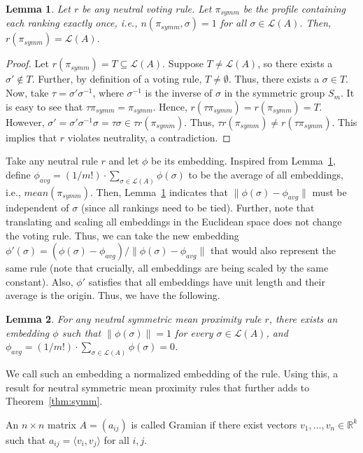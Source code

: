 \documentclass[10pt,letterpaper]{article}
\newcommand{\calL}{{\mathcal{L}}}
\newcommand{\rank}{{\calL(A)}}
\newtheorem{lemma}{Lemma}
\newenvironment{definition}[1][Definition]{\begin{trivlist}
\item[\hskip \labelsep {\bfseries #1}]}{\end{trivlist}}
\begin{document}
\begin{lemma}
Let $r$ be any neutral voting rule. Let $\pi_{symm}$ be the profile containing each ranking exactly once, i.e., $n(\pi_{symm},\sigma) = 1$ for all $\sigma \in \rank$. Then, $r(\pi_{symm}) = \rank$. 
\label{lem:average-profile}
\end{lemma}
\begin{proof}
Let $r(\pi_{symm}) = T \subseteq \rank$. Suppose $T \neq \rank$, so there exists a $\sigma' \notin T$. Further, by definition of a voting rule, $T \neq \emptyset$. Thus, there exists a $\sigma \in T$. Now, take $\tau = \sigma' \sigma^{-1}$, where $\sigma^{-1}$ is the inverse of $\sigma$ in the symmetric group $S_m$. It is easy to see that $\tau \pi_{symm} = \pi_{symm}$. Hence, $r(\tau \pi_{symm}) = r(\pi_{symm}) = T$. However, $\sigma' = \sigma' \sigma^{-1} \sigma = \tau \sigma \in \tau r(\pi_{symm})$. Thus, $\tau r(\pi_{symm}) \neq r(\tau \pi_{symm})$. This implies that $r$ violates neutrality, a contradiction. 
\end{proof}

Take any neutral rule $r$ and let $\phi$ be its embedding. Inspired from Lemma~\ref{lem:average-profile}, define $\phi_{avg} = (1/{m!}) \cdot \sum_{\sigma \in \rank} \phi(\sigma)$ to be the average of all embeddings, i.e., $mean(\pi_{symm})$. Then, Lemma~\ref{lem:average-profile} indicates that $\|\phi(\sigma)-\phi_{avg}\|$ must be independent of $\sigma$ (since all rankings need to be tied). Further, note that translating and scaling all embeddings in the Euclidean space does not change the voting rule. Thus, we can take the new embedding $\phi'(\sigma) = (\phi(\sigma)-\phi_{avg})/\|\phi(\sigma)-\phi_{avg}\|$ that would also represent the same rule (note that crucially, all embeddings are being scaled by the same constant). Also, $\phi'$ satisfies that all embeddings have unit length and their average is the origin. Thus, we have the following.

\begin{lemma}
For any neutral symmetric mean proximity rule $r$, there exists an embedding $\phi$ such that $\|\phi(\sigma)\| = 1$ for every $\sigma \in \rank$, and $\phi_{avg} = (1/{m!}) \cdot \sum_{\sigma \in \rank} \phi(\sigma) = 0$.
\label{lem:normalized-embedding}
\end{lemma}

We call such an embedding a normalized embedding of the rule. Using this, a result for neutral symmetric mean proximity rules that further adds to Theorem~\ref{thm:symm}. 
\begin{definition}[Gramian Matrix]
An $n \times n$ matrix $A = (a_{ij})$ is called Gramian if there exist vectors $v_1,\ldots,v_n \in \mathbb{R}^k$ such that $a_{ij} = \langle v_i,v_j \rangle$ for all $i,j$. 
\end{definition}
\end{document}
